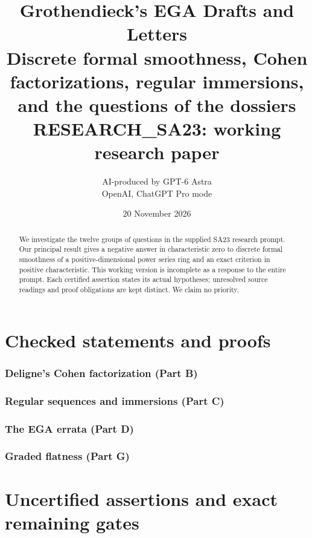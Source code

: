 \documentclass[11pt,a4paper]{article}
\title{\textbf{Grothendieck's EGA Drafts and Letters}\\[0.6em]
\large Discrete formal smoothness, Cohen factorizations, regular immersions,\\
and the questions of the dossiers\\[0.8em]\normalsize RESEARCH\_SA23: working research paper}
\author{AI-produced by GPT-6 Astra\\\small OpenAI, ChatGPT Pro mode}
\date{20 November 2026}
\numberwithin{equation}{section}
\theoremstyle{definition}
\theoremstyle{remark}
\begin{document}
\maketitle
\begin{abstract}
We investigate the twelve groups of questions in the supplied SA23
research prompt.  Our principal result gives a negative answer in
characteristic zero to discrete formal smoothness of a positive-dimensional
power series ring and an exact criterion in positive characteristic.
This working version is incomplete as a response to the entire prompt.
Each certified assertion states its actual hypotheses; unresolved source
readings and proof obligations are kept distinct.  We claim no priority.
\end{abstract}
\tableofcontents
\clearpage
\part{Checked statements and proofs}


\section{Deligne's Cohen factorization (Part B)}
\section{Regular sequences and immersions (Part C)}
\section{The EGA errata (Part D)}
\section{Graded flatness (Part G)}
\clearpage
\part{Uncertified assertions and exact remaining gates}
\clearpage
\nocite{*}


\end{document}
